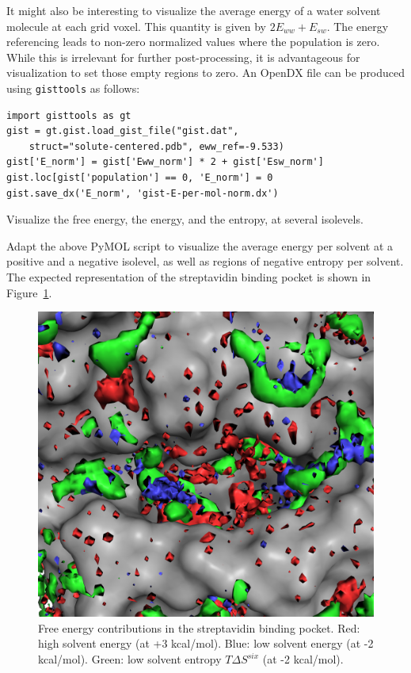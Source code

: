 \documentclass[9pt,tutorial]{livecoms}
\newcommand{\software}{\texttt}
\begin{document}
It might also be interesting to visualize the average energy of a water solvent molecule at each grid voxel.
This quantity is given by $2E_{ww} + E_{sw}$.
The energy referencing leads to non-zero normalized values where the population is zero.
While this is irrelevant for further post-processing, it is advantageous for visualization to set those empty regions to zero.
An OpenDX file can be produced using \software{gisttools} as follows:

\begin{lstlisting}[style=python]
import gisttools as gt
gist = gt.gist.load_gist_file("gist.dat",
    struct="solute-centered.pdb", eww_ref=-9.533)
gist['E_norm'] = gist['Eww_norm'] * 2 + gist['Esw_norm']
gist.loc[gist['population'] == 0, 'E_norm'] = 0
gist.save_dx('E_norm', 'gist-E-per-mol-norm.dx')
\end{lstlisting}

Visualize the free energy, the energy, and the entropy, at several isolevels.

Adapt the above PyMOL script to visualize the average energy per solvent at a positive and a negative isolevel, as well as regions of negative entropy per solvent.
The expected representation of the streptavidin binding pocket is shown in Figure~\ref{fig_binding_pocket_pymol}.

\begin{figure}
	\centering
	\includegraphics[width=0.8\linewidth]{figures/binding_pocket_S_-2_E_-2_E_3.png}
	\caption{Free energy contributions in the streptavidin binding pocket. Red: high solvent energy (at +3 kcal/mol). Blue: low solvent energy (at -2 kcal/mol). Green: low solvent entropy $T\Delta S^{six}$ (at -2 kcal/mol).}\label{fig_binding_pocket_pymol}
\end{figure}
\end{document}

